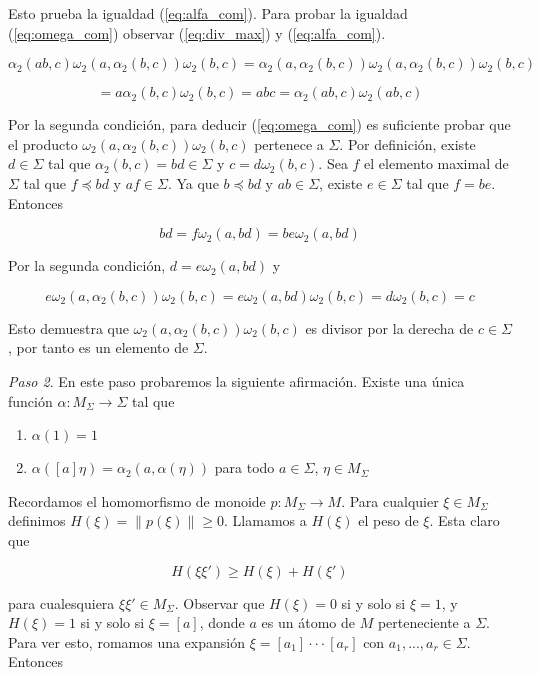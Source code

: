 \documentclass[12pt]{article}
\theoremstyle{definition}
\providecommand{\norm}[1]{\lVert#1\rVert}
\begin{document}
Esto prueba la igualdad (\ref{eq:alfa_com}). Para probar la igualdad (\ref{eq:omega_com}) observar (\ref{eq:div_max}) y (\ref{eq:alfa_com}).

$$\alpha_2(ab,c)\omega_2(a,\alpha_2(b,c))\omega_2(b,c)=\alpha_2(a,\alpha_2(b,c))\omega_2(a,\alpha_2(b,c))\omega_2(b,c)$$

$$=a\alpha_2(b,c)\omega_2(b,c)=abc=\alpha_2(ab,c)\omega_2(ab,c)$$

Por la segunda condición, para deducir (\ref{eq:omega_com}) es suficiente probar que el producto $\omega_2(a,\alpha_2(b,c))\omega_2(b,c)$ pertenece a $\Sigma$. Por definición, existe $d\in\Sigma$ tal que $\alpha_2(b,c)=bd\in\Sigma$ y $c=d\omega_2(b,c)$. Sea $f$ el elemento maximal de $\Sigma$ tal que $f\preceq bd$ y $af\in\Sigma$. Ya que $b\preceq bd$ y $ab\in\Sigma$, existe $e\in\Sigma$ tal que $f=be$. Entonces

$$bd=f\omega_2(a,bd)=be\omega_2(a,bd)$$

Por la segunda condición, $d=e\omega_2(a,bd)$ y

$$e\omega_2(a,\alpha_2(b,c))\omega_2(b,c)=e\omega_2(a,bd)\omega_2(b,c)=d\omega_2(b,c)=c$$

Esto demuestra que $\omega_2(a,\alpha_2(b,c))\omega_2(b,c)$ es divisor por la derecha de $c\in\Sigma$, por tanto es un elemento de $\Sigma$.

\textit{Paso 2}. En este paso probaremos la siguiente afirmación. Existe una única función $\alpha:M_\Sigma\rightarrow\Sigma$ tal que

\begin{enumerate}[label=\roman*.]
\item $\alpha(1)=1$
\item $\alpha([a]\eta)=\alpha_2(a,\alpha(\eta))$ para todo $a\in\Sigma$, $\eta\in M_\Sigma$
\end{enumerate}

Recordamos el homomorfismo de monoide $p:M_\Sigma\rightarrow M$. Para cualquier $\xi\in M_\Sigma$ definimos $H(\xi)=\norm{p(\xi)}\geq 0$. Llamamos a $H(\xi)$ el peso de $\xi$. Esta claro que

$$H(\xi\xi')\geq H(\xi)+H(\xi')$$
\newline

para cualesquiera $\xi\xi'\in M_\Sigma$. Observar que $H(\xi)=0$ si y solo si $\xi=1$, y $H(\xi)=1$ si y solo si $\xi=[a]$, donde $a$ es un átomo de $M$ perteneciente a $\Sigma$. Para ver esto, romamos una expansión $\xi=[a_1]\cdot\cdot\cdot[a_r]$ con $a_1,...,a_r\in\Sigma$. Entonces
\end{document}
